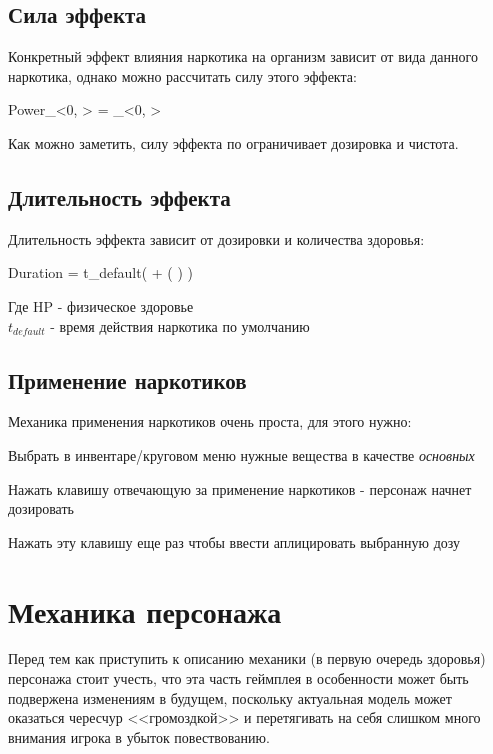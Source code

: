 \documentclass[11pt]{report}
\newenvironment{enumerate*}%
  {\begin{enumerate}%
    \setlength{\itemsep}{2pt}%
    \setlength{\parskip}{0.75pt}}%
  {\end{enumerate}}
\begin{document}
\subsection{Сила эффекта}
Конкретный эффект влияния наркотика на организм зависит от вида данного наркотика, однако можно рассчитать силу этого эффекта:
\begin{myequation}
			{Power}_{<0, \infty >} =  _{<0, \infty >}
\end{myequation}
Как можно заметить, силу эффекта по ограничивает дозировка и чистота.

\subsection{Длительность эффекта}
Длительность эффекта зависит от дозировки и количества здоровья:
\begin{myequation}
	Duration = t_{default}\cdot\left( + \left(  \right) \right)
\end{myequation}
Где HP - физическое здоровье\\
\begin{math}
	t_{default} 
\end{math} - время действия наркотика по умолчанию

\subsection{Применение наркотиков}
Механика применения наркотиков очень проста, для этого нужно: \begin{enumerate*}
	\item Выбрать в инвентаре/круговом меню нужные вещества в качестве \textit{основных}
	\item Нажать клавишу отвечающую за применение наркотиков - персонаж начнет дозировать
	\item Нажать эту клавишу еще раз чтобы ввести аплицировать выбранную дозу
\end{enumerate*}

\section{Механика персонажа}
Перед тем как приступить к описанию механики (в первую очередь здоровья) персонажа стоит учесть, что эта часть геймплея в особенности может быть подвержена изменениям в будущем, поскольку актуальная модель может оказаться чересчур <<громоздкой>> и перетягивать на себя слишком много внимания игрока в убыток повествованию.
\end{document}
